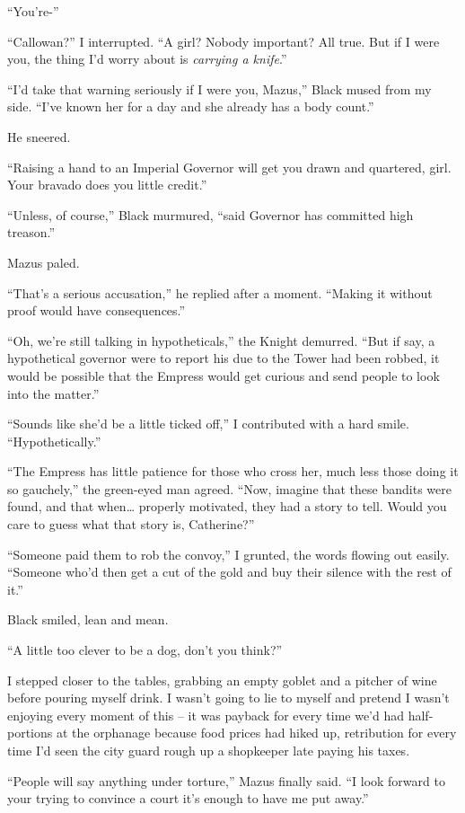 \documentclass[12pt, openany]{book}
\begin{document}
“You’re-”

“Callowan?” I interrupted. “A girl? Nobody important? All true. But if I were you, the thing I’d worry about is \textit{carrying a knife}.”

“I’d take that warning seriously if I were you, Mazus,” Black mused from my side. “I’ve known her for a day and she already has a body count.”

He sneered.

“Raising a hand to an Imperial Governor will get you drawn and quartered, girl. Your bravado does you little credit.”

“Unless, of course,” Black murmured, “said Governor has committed high treason.”

Mazus paled.

“That’s a serious accusation,” he replied after a moment. “Making it without proof would have consequences.”

“Oh, we’re still talking in hypotheticals,” the Knight demurred. “But if say, a hypothetical governor were to report his due to the Tower had been robbed, it would be possible that the Empress would get curious and send people to look into the matter.”

“Sounds like she’d be a little ticked off,” I contributed with a hard smile. “Hypothetically.”

“The Empress has little patience for those who cross her, much less those doing it so gauchely,” the green-eyed man agreed. “Now, imagine that these bandits were found, and that when… properly motivated, they had a story to tell. Would you care to guess what that story is, Catherine?”

“Someone paid them to rob the convoy,” I grunted, the words flowing out easily. “Someone who’d then get a cut of the gold and buy their silence with the rest of it.”

Black smiled, lean and mean.

“A little too clever to be a dog, don’t you think?”

I stepped closer to the tables, grabbing an empty goblet and a pitcher of wine before pouring myself drink. I wasn’t going to lie to myself and pretend I wasn’t enjoying every moment of this – it was payback for every time we’d had half-portions at the orphanage because food prices had hiked up, retribution for every time I’d seen the city guard rough up a shopkeeper late paying his taxes.

“People will say anything under torture,” Mazus finally said. “I look forward to your trying to convince a court it’s enough to have me put away.”
\end{document}
